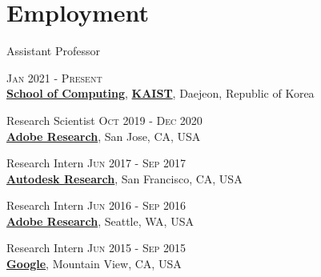 \documentclass[letterpaper,10pt]{article} %
\newcommand{\blankline}{\quad\pagebreak[2]}
\begin{document}
\blankline



\section{Employment}

Assistant Professor \hfill{\textsc{Jan 2021 - Present}\\
\href{http://cs.kaist.ac.kr/}{\textbf{School of Computing}}, \href{http://www.kaist.ac.kr/}{\textbf{KAIST}}, Daejeon, Republic of Korea


Research Scientist \hfill{\textsc{Oct 2019 - Dec 2020}}\\
\href{https://research.adobe.com}{\textbf{Adobe Research}}, San Jose, CA, USA 


Research Intern \hfill{\textsc{Jun 2017 - Sep 2017}}\\
\href{https://www.autodeskresearch.com}{\textbf{Autodesk Research}}, San Francisco, CA, USA


Research Intern \hfill{\textsc{Jun 2016 - Sep 2016}}\\
\href{https://research.adobe.com/}{\textbf{Adobe Research}}, Seattle, WA, USA


Research Intern \hfill{\textsc{Jun 2015 - Sep 2015}}\\
\href{http://www.google.com}{\textbf{Google}}, Mountain View, CA, USA

}
\end{document}
